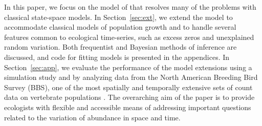\documentclass[12pt]{article}
\begin{document}
In this paper, we focus on the model of \citet[henceforth the DM model]{dail_madsen:2011}
that resolves many of the problems with classical state-space models.
In Section~\ref{sec:ext}, we extend the
model to accommodate classical models of population growth and
to handle several features common to ecological
time-series, such as excess zeros and unexplained random variation. 
Both frequentist and Bayesian methods of inference are discussed, and
code for fitting models is presented in the appendices.
In Section~\ref{sec:app}, we evaluate the performance of the model
extensions using a simulation study and by analyzing data from the
North American Breeding Bird Survey (BBS), one of
the most spatially and temporally extensive sets of count data on
vertebrate populations \citep{robbins_etal:1986}. The overarching aim
of the paper is to provide ecologists with flexible and accessible means of
addressing important questions related to the variation of abundance in
space and time. 
\end{document}
